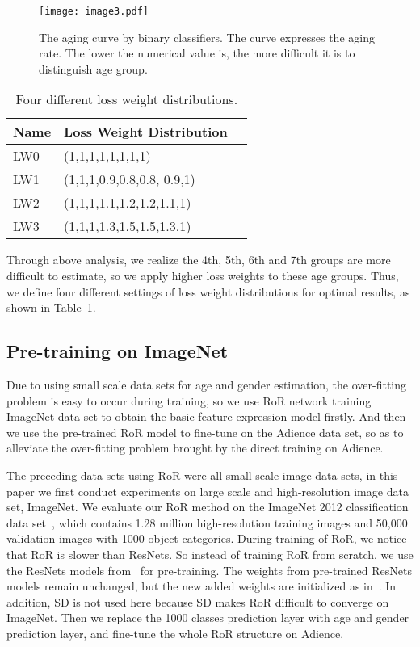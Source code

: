 \documentclass[journal]{IEEEtran}
\begin{document}
\begin{figure}

\centering
\texttt{[image: image3.pdf]}
\caption{The aging curve by binary classifiers. The curve expresses the aging rate. The lower the numerical value is, the more difficult it is to distinguish age group.}
\label{fig:agecurve}
\end{figure}
\begin{table}[h]
\centering
\renewcommand{\arraystretch}{1.3}
\caption{Four different loss weight distributions.}
\begin{tabular}{|p{2.5cm}|p{4cm}|c|}
\hline
Name           &Loss Weight Distribution     \\ 
\hline
\hline
LW0                    &(1,1,1,1,1,1,1,1)     \\
\hline
LW1         &(1,1,1,0.9,0.8,0.8, 0.9,1)   \\
\hline
LW2         &(1,1,1,1.1,1.2,1.2,1.1,1)   \\
\hline
LW3           &(1,1,1,1.3,1.5,1.5,1.3,1)   \\
\hline
\end{tabular}

\label{tab:tab13}
\end{table}

Through above analysis, we realize the 4th, 5th, 6th and 7th groups are more difficult to estimate, so we apply higher loss weights to these age groups. 
Thus, we define four different settings of loss weight distributions for optimal results, as shown in Table~\ref{tab:tab13}.

\subsection{Pre-training on ImageNet}
Due to using small scale data sets for age and gender estimation, the over-fitting problem is easy to occur during training, so we use RoR network training ImageNet data set to obtain the basic feature expression model firstly. And then we use the pre-trained RoR model to fine-tune on the Adience data set, so as to alleviate the over-fitting problem brought by the direct training on Adience.
\par
The preceding data sets using RoR were all small scale image data sets, in this paper we first conduct experiments on large scale and high-resolution image data set, ImageNet. We evaluate our RoR method on the ImageNet 2012 classification data set~\cite{Russ2014imagenetchallenge}, which contains 1.28 million high-resolution training images and 50,000 validation images with 1000 object categories. During training of RoR, we notice that RoR is slower than ResNets. So instead of training RoR from scratch, we use the ResNets models from~\cite{gross2016facebookres} for pre-training. The weights from pre-trained ResNets models remain unchanged, but the new added weights are initialized as in~\cite{he2015prelu}. In addition, SD is not used here because SD makes RoR difficult to converge on ImageNet. Then we replace the 1000 classes prediction layer with age and gender prediction layer, and fine-tune the whole RoR structure on Adience. 
\end{document}
